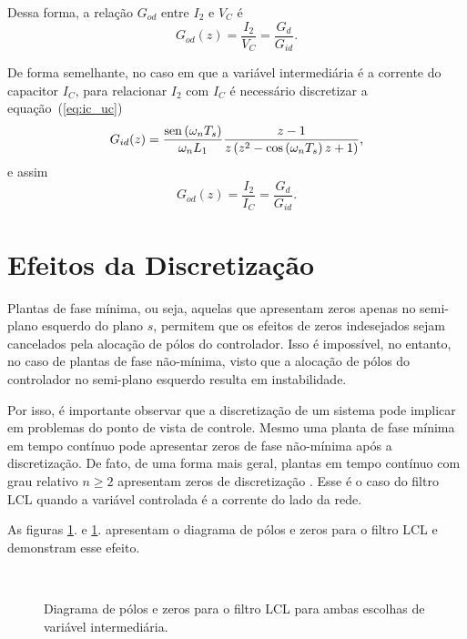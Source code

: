     Dessa forma, a relação $G_{od}$ entre $I_2$ e $V_C$ é
    \begin{equation}
        G_{od}(z) = \frac{I_2}{V_C} = \frac{G_d}{G_{id}} \text{.}
    \end{equation}

    De forma semelhante, no caso em que a variável intermediária é a corrente do
    capacitor $I_C$, para relacionar $I_2$ com $I_C$ é necessário discretizar a
    equação~(\ref{eq:ic_uc})
    \begin{equation}
        G_{id}(z) = \frac{\operatorname{sen} \left( \omega_n T_s \right)}{\omega_n L_1}
            \frac{z-1}{z \left( z^2 - \cos \left( \omega_n T_s \right) z + 1 \right)}
            \text{,}
    \end{equation}
    e assim
    \begin{equation}
        G_{od}(z) = \frac{I_2}{I_C} = \frac{G_d}{G_{id}} \text{.}
    \end{equation}


\section{Efeitos da Discretização}

    Plantas de fase mínima, ou seja, aquelas que apresentam zeros apenas no
    semi-plano esquerdo do plano $s$, permitem que os efeitos de zeros indesejados
    sejam cancelados pela alocação de pólos do controlador. Isso é impossível,
    no entanto, no caso de plantas de fase não-mínima, visto que a alocação de
    pólos do controlador no semi-plano esquerdo resulta em instabilidade.

    Por isso, é importante observar que a discretização de um sistema pode implicar
    em problemas do ponto de vista de controle. Mesmo uma planta de fase mínima em
    tempo contínuo pode apresentar zeros de fase não-mínima após a discretização.
    De fato, de uma forma mais geral, plantas em tempo contínuo com grau relativo
    $n \ge 2$ apresentam zeros de discretização \cite{ref:ASTROM}. Esse é o caso
    do filtro LCL quando a variável controlada é a corrente do lado da rede.

    As figuras \ref{fig:pzmap_ic_vc}. e
    \ref{fig:pzmap_ic_vc}. apresentam o diagrama de pólos
    e zeros para o filtro LCL e demonstram esse efeito.

    \begin{figure}[htb]
        \centering
        \\
        \renewcommand\figurename{Fig.}
        \caption{Diagrama de pólos e zeros para o filtro LCL para ambas escolhas
            de variável intermediária.}
        \label{fig:pzmap_ic_vc}
    \end{figure}


